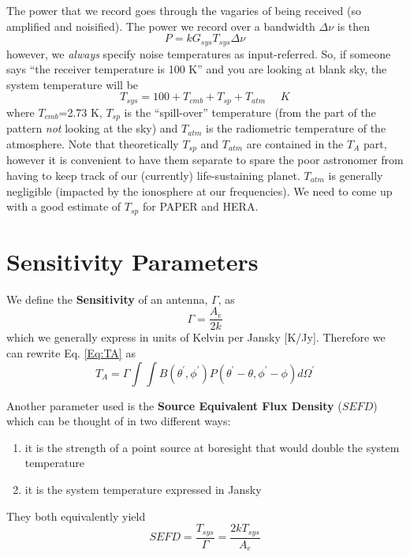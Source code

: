 \documentclass[11pt]{article}
\begin{document}
The power that we record goes through the vagaries of being received (so amplified and noisified).  The power we record over a bandwidth $\Delta\nu$ is then
\begin{equation}
P = kG_{sys}T_{sys}\Delta\nu
\end{equation}
however, we {\em always} specify noise temperatures as input-referred.  So, if someone says ``the receiver temperature is 100 K'' and you are looking at blank sky, 
the system temperature will be 
\begin{equation}
T_{sys} = 100 + T_{cmb} + T_{sp} + T_{atm} ~~~~~~K 
\end{equation}
where $T_{cmb}$=2.73 K, $T_{sp}$ is the ``spill-over'' temperature (from the part of the pattern {\em not} looking at the sky) and $T_{atm}$ is the radiometric temperature of the atmosphere.  Note that theoretically $T_{sp}$ and $T_{atm}$ are contained in the $T_A$ part, however it is convenient to have them separate to spare the poor astronomer from having to keep track of our (currently) life-sustaining planet.  $T_{atm}$ is generally negligible (impacted by the ionosphere at our frequencies).  We need to come up with a good estimate of $T_{sp}$ for PAPER and HERA.

\section{Sensitivity Parameters}
We define the {\bf Sensitivity} of an antenna, $\Gamma$, as
\begin{equation}
\Gamma = \frac{A_e}{2k}
\end{equation}
which we generally express in units of Kelvin per Jansky [K/Jy].  Therefore we can rewrite Eq. \ref{Eq:TA} as
\begin{equation}
T_A =  \Gamma \int \int B(\theta^\prime,\phi^\prime)P(\theta^\prime-\theta,\phi^\prime-\phi)d\Omega^\prime
\end{equation}

Another parameter used is the {\bf Source Equivalent Flux Density} ($SEFD$) which can be thought of in two different ways:
\begin{enumerate}
	\item it is the strength of a point source at boresight that would double the system temperature
	\item it is the system temperature expressed in Jansky
\end{enumerate}
They both equivalently yield
\begin{equation}
SEFD = \frac{T_{sys}}{\Gamma} = \frac{2kT_{sys}}{A_e}
\end{equation}
\end{document}
